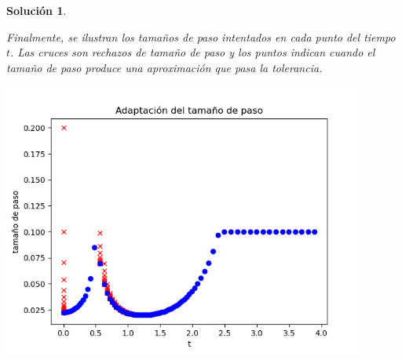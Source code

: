 \documentclass[11pt]{article}
\newtheorem*{sol}{Solución}
\begin{document}
\begin{sol}
\begin{center}
  \end{center}
  Finalmente, se ilustran los tamaños de paso intentados en cada punto
  del tiempo $t$. Las cruces son rechazos de tamaño de paso y los
  puntos indican cuando el tamaño de paso produce una aproximación que
  pasa la tolerancia.
  \begin{center}
  \includegraphics[width=0.9\textwidth]{img/jaac_tarea3_ejercicio1c}
  \end{center}
\end{sol}

\newpage
\end{document}
